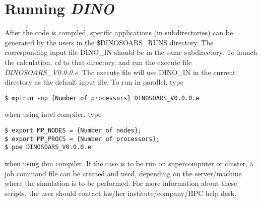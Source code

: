 \section{Running {\it DINO}}
\label{Running}
After the code is compiled, specific applications (in subdirectories) can be generated by the users in the \$DINOSOARS\_RUNS directory. The corresponding input file DINO\_IN should be in the same subdirectory. To launch the calculation, \textit{cd} to that directory, and run the execute file \textit{DINOSOARS\_V0.0.0.e}. The execute file will use DINO\_IN in the current directory as the default input file. To run in parallel, type
\begin{lstlisting}
$ mpirun -np {Number of processors} DINOSOARS_V0.0.0.e
\end{lstlisting}
when using intel compiler, type
\begin{lstlisting}
$ export MP_NODES = {Number of nodes};
$ export MP_PROCS = {Number of processors};
$ poe DINOSOARS_V0.0.0.e
\end{lstlisting}
when using ibm compiler.
If the case is to be run on supercomputer or cluster, a job command file can be created and used, depending on the server/machine where the simulation is to be performed. For more information about these scripts, the user should contact his/her institute/company/HPC help desk.
